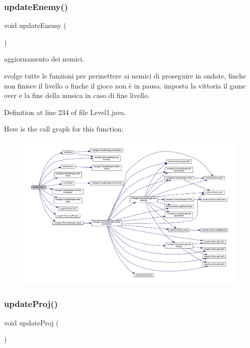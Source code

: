 \subsubsection{\texorpdfstring{update\+Enemy()}{updateEnemy()}}
{\footnotesize\ttfamily void update\+Enemy (\begin{DoxyParamCaption}{ }\end{DoxyParamCaption})}



aggiornamento dei nemici. 

svolge tutte le funzioni per permettere ai nemici di proseguire in ondate, finche non finisce il livello o finche il gioco non è in pausa. imposta la vittoria il game over e la fine della musica in caso di fine livello. 

Definition at line 234 of file Level1.\+java.

Here is the call graph for this function\+:
\nopagebreak
\begin{figure}[H]
\begin{center}
\leavevmode
\includegraphics[width=350pt]{classscenes_1_1_level1_af005ec68c869a6acd5e833cba9330a50_cgraph}
\end{center}
\end{figure}
\mbox{\label{classscenes_1_1_level1_ac83c203b559f6fd0bb225744d7ccf854}} 
\subsubsection{\texorpdfstring{update\+Proj()}{updateProj()}}
{\footnotesize\ttfamily void update\+Proj (\begin{DoxyParamCaption}{ }\end{DoxyParamCaption})}



